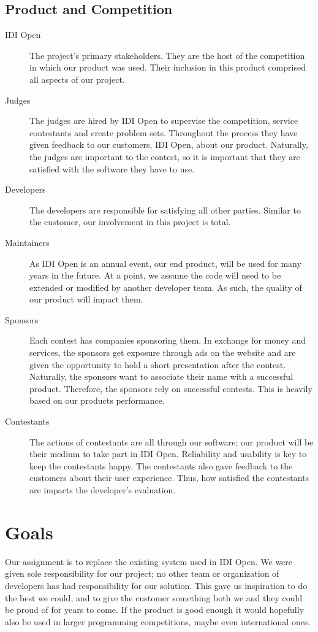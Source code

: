 \subsection{Product and Competition}
\begin{description}
\item[IDI Open]
The project's primary stakeholders. They are the host of
the competition in which our product was used. Their inclusion in this
product comprised all aspects of our project.

\item[Judges]
The judges are hired by IDI Open to supervise the competition, service
contestants and create problem sets. Throughout the process they have given
feedback to our customers, IDI Open, about our product. Naturally, the
judges are important to the contest, so it is important that they are
satisfied with the software they have to use.

\item[Developers]
The developers are responsible for satisfying all other parties. Similar
to the customer, our involvement in this project is total.

\item[Maintainers]
As IDI Open is an annual event, our end product, will be used for many 
years in the future. At a point, we assume the code will need to be 
extended or modified by another developer team. 
As such, the quality of our product will impact them.

\item[Sponsors]
Each contest has companies sponsoring them. In exchange for money and
services, the sponsors get exposure through ads on the website and are
given the opportunity to hold a short presentation after the contest. Naturally, the
sponsors want to associate their name with a successful product.
Therefore, the sponsors rely on successful contests. This is
heavily based on our products performance.

\item[Contestants]
The actions of contestants are all through our software; our product
will be their medium to take part in IDI Open. Reliability and
usability is key to keep the contestants happy. The contestants also
gave feedback to the customers about their user experience. Thus, how
satisfied the contestants are impacts the developer's
evaluation.
\end{description}

\section{Goals}
Our assignment is to replace the existing system
used in IDI Open. We were given sole responsibility for our project; no
other team or organization of developers has had responsibility for our
solution. This gave us inspiration to do the best we could, and to give
the customer something both we and they could be proud of for years to come. 
If the product is good enough it would hopefully
also be used in larger programming competitions, maybe even
international ones.

